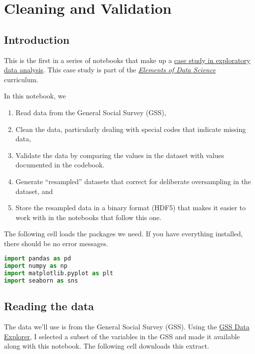 \hypertarget{cleaning-and-validation}{%
\chapter{Cleaning and Validation}\label{cleaning-and-validation}}

\hypertarget{introduction}{%
\section{Introduction}\label{introduction}}

This is the first in a series of notebooks that make up a
\href{https://allendowney.github.io/PoliticalAlignmentCaseStudy/}{case
study in exploratory data analysis}. This case study is part of the
\href{https://allendowney.github.io/ElementsOfDataScience/}{\emph{Elements
of Data Science}} curriculum.

In this notebook, we

\begin{enumerate}
\def\labelenumi{\arabic{enumi}.}
\item
  Read data from the General Social Survey (GSS),
\item
  Clean the data, particularly dealing with special codes that indicate
  missing data,
\item
  Validate the data by comparing the values in the dataset with values
  documented in the codebook.
\item
  Generate ``resampled'' datasets that correct for deliberate
  oversampling in the dataset, and
\item
  Store the resampled data in a binary format (HDF5) that makes it
  easier to work with in the notebooks that follow this one.
\end{enumerate}

The following cell loads the packages we need. If you have everything
installed, there should be no error messages.

\begin{lstlisting}[language=Python,style=source]
import pandas as pd
import numpy as np
import matplotlib.pyplot as plt
import seaborn as sns
\end{lstlisting}

\hypertarget{reading-the-data}{%
\section{Reading the data}\label{reading-the-data}}

The data we'll use is from the General Social Survey (GSS). Using the
\href{https://gssdataexplorer.norc.org/projects/52787}{GSS Data
Explorer}, I selected a subset of the variables in the GSS and made it
available along with this notebook. The following cell downloads this
extract.


